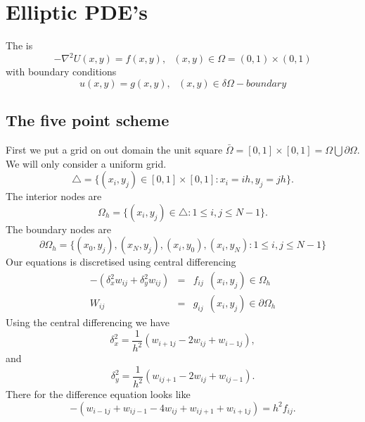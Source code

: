 \chapter{Elliptic PDE's}
The  is
\[ -\nabla^2U(x,y)=f(x,y), \ \ \ (x,y) \in \Omega=(0,1)\times (0,1) \]
with boundary conditions
\[u(x,y) = g(x,y), \ \ \  (x,y)\in\delta\Omega-boundary \]
\section{The five point scheme}
First we put a grid on out domain the unit square $\bar{\Omega}=[0,1]\times[0,1]=\Omega \bigcup \partial\Omega$. We will only consider a uniform grid.
\[ \triangle = \{(x_i,y_j)\in [0,1]\times[0,1]:x_i=ih,y_j=jh \}.\]
The interior nodes are
\[ \Omega_h= \{(x_i,y_j)\in \triangle:1\leq i,j\leq N-1 \}.\]
The boundary nodes are
\[ \partial\Omega_h= \{(x_0,y_j),(x_{N},y_j),(x_{i},y_0),(x_{i},y_N)
:1\leq i,j\leq N-1 \}\]
Our equations is discretised using central differencing
\begin{eqnarray*}
-(\delta_x^2w_{ij}+\delta_y^2w_{ij})&=&f_{ij} \ \ (x_i,y_j) \in \Omega_h \\
W_{ij}&=&g_{ij} \ \ (x_i,y_j) \in \partial\Omega_h 
\end{eqnarray*}
Using the central differencing we have
\[\delta_x^2=\frac{1}{h^2}(w_{i+1j}-2w_{ij}+w_{i-1j}), \]
and
\[\delta_y^2=\frac{1}{h^2}(w_{ij+1}-2w_{ij}+w_{ij-1}). \]
There for the difference equation looks like
\[-(w_{i-1j}+w_{ij-1}-4w_{ij}+w_{ij+1}+w_{i+1j})=h^2f_{ij}. \]

